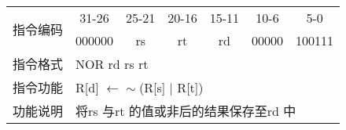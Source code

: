 	\begin{table}[!hbp]
		\centering
		\begin{tabular}{|c|c|c|c|c|c|c|}
		\hline
		\multirow{2}{*}{指令编码} & 31-26&25-21 & 20-16&15-11 &10-6 &5-0\\
		\cline{2-7} & 000000 & rs & rt & rd & 00000 & 100111 \\
		\hline
		指令格式&\multicolumn{6}{|l|}{NOR rd rs rt}\\
		\hline		
		指令功能&\multicolumn{6}{|l|}{R[d] $\leftarrow \sim$(R[s] $|$ R[t])}\\
		\hline		
		功能说明&\multicolumn{6}{|l|}{将rs 与rt 的值或非后的结果保存至rd 中}\\
		\hline
		\end{tabular}
	\end{table}
\newpage

